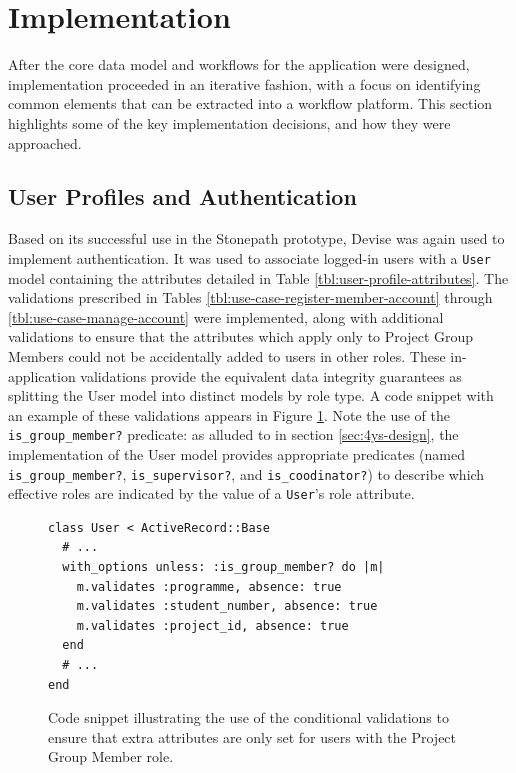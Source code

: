 \documentclass[document.tex]{subfiles}
\begin{document}
\section{Implementation}
\label{sec:4ys-implementation}

After the core data model and workflows for the application were designed, implementation proceeded in an iterative fashion, with a focus on identifying common elements that can be extracted into a workflow platform. This section highlights some of the key implementation decisions, and how they were approached.


\subsection{User Profiles and Authentication}
\label{sec:4ys-authentication}

Based on its successful use in the Stonepath prototype, Devise was again used to implement authentication. It was used to associate logged-in users with a \verb!User! model containing the attributes detailed in Table \ref{tbl:user-profile-attributes}. The validations prescribed in Tables \ref{tbl:use-case-register-member-account} through \ref{tbl:use-case-manage-account} were implemented, along with additional validations to ensure that the attributes which apply only to Project Group Members could not be accidentally added to users in other roles. These in-application validations provide the equivalent data integrity guarantees as splitting the User model into distinct models by role type. A code snippet with an example of these validations appears in Figure \ref{fig:4ys-user-validations}. Note the use of the \verb!is_group_member?! predicate: as alluded to in section \ref{sec:4ys-design}, the implementation of the User model provides appropriate predicates (named \verb!is_group_member?!, \verb!is_supervisor?!, and \verb!is_coodinator?!) to describe which effective roles are indicated by the value of a \verb!User!’s role attribute.

\begin{figure}[!ht]
  \begin{lstlisting}
class User < ActiveRecord::Base
  # ...
  with_options unless: :is_group_member? do |m|
    m.validates :programme, absence: true
    m.validates :student_number, absence: true
    m.validates :project_id, absence: true
  end
  # ...
end
  \end{lstlisting}
  \caption{Code snippet illustrating the use of the conditional validations to ensure that extra attributes are only set for users with the Project Group Member role.}
  \label{fig:4ys-user-validations}
\end{figure}
\end{document}
